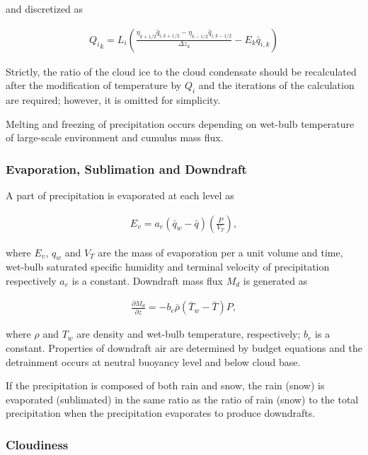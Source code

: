 and discretized as

\begin{eqnarray}
 {Q_i}_k = L_i \left(\frac{\eta_{k+1/2} \hat{q}_{i,k+1/2} - \eta_{k-1/2} \hat{q}_{i,k-1/2}}{\Delta z_k} - E_k \bar{q}_{i,k} \right)
\end{eqnarray}

Strictly, the ratio of the cloud ice to the cloud condensate should be
recalculated after the modification of temperature by \(Q_i\) and the
iterations of the calculation are required; however, it is omitted for
simplicity.

Melting and freezing of precipitation occurs depending on wet-bulb
temperature of large-scale environment and cumulus mass flux.

\hypertarget{evaporation-sublimation-and-downdraft}{%
\subsubsection{Evaporation, Sublimation and
Downdraft}\label{evaporation-sublimation-and-downdraft}}

A part of precipitation is evaporated at each level as

\begin{eqnarray}
 E_v = a_e (\bar{q}_w - \bar{q}) \left(\frac{P}{V_T}\right),
\end{eqnarray}

where \(E_v\), \(q_w\) and \(V_T\) are the mass of evaporation per a
unit volume and time, wet-bulb saturated specific humidity and terminal
velocity of precipitation respectively \(a_e\) is a constant. Downdraft
mass flux \(M_d\) is generated as

\begin{eqnarray}
 \frac{\partial M_d}{\partial z} = -b_e \bar{\rho} (\bar{T}_w - \bar{T}) P,
\end{eqnarray}

where \(\rho\) and \(T_w\) are density and wet-bulb temperature,
respectively; \(b_e\) is a constant. Properties of downdraft air are
determined by budget equations and the detrainment occurs at neutral
buoyancy level and below cloud base.

If the precipitation is composed of both rain and snow, the rain (snow)
is evaporated (sublimated) in the same ratio as the ratio of rain (snow)
to the total precipitation when the precipitation evaporates to produce
downdrafts.

\hypertarget{cloudiness}{%
\subsubsection{Cloudiness}\label{cloudiness}}


